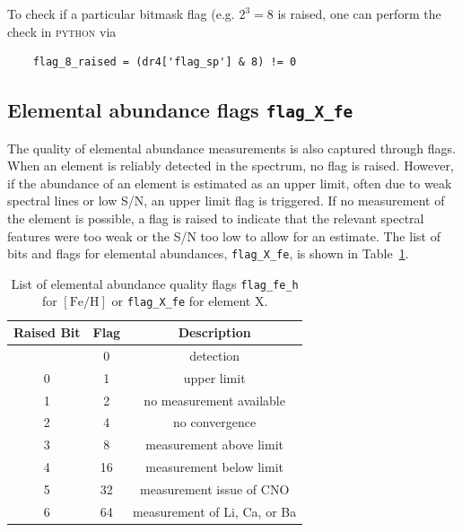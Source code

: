 \documentclass[
  journal=pasa,
  manuscript=research-paper, %
  year=2024,
  volume=37
]{cup-journal}
\newcommand{\feh}{$\mathrm{[Fe/H]}$\xspace}
\begin{document}
To check if a particular bitmask flag (e.g. $2^3 = 8$ is raised, one can perform the check in \textsc{python} via
\begin{verbatim}
    flag_8_raised = (dr4['flag_sp'] & 8) != 0
\end{verbatim}

\subsection{Elemental abundance flags \texttt{flag\_X\_fe}}
\label{sec:flag_x_fe}

The quality of elemental abundance measurements is also captured through flags. When an element is reliably detected in the spectrum, no flag is raised. However, if the abundance of an element is estimated as an upper limit, often due to weak spectral lines or low S/N, an upper limit flag is triggered. If no measurement of the element is possible, a flag is raised to indicate that the relevant spectral features were too weak or the S/N too low to allow for an estimate. The list of bits and flags for elemental abundances, \texttt{flag\_X\_fe}, is shown in Table~\ref{tab:flag_x_fe}.

\begin{table}
\centering
\caption{List of elemental abundance quality flags \texttt{flag\_fe\_h} for \feh or \texttt{flag\_X\_fe} for element X.}
\label{tab:flag_x_fe}
\begin{tabular}{ccc}
\hline \hline
Raised Bit & Flag & Description \\
\hline
  & 0 & detection \\ 
0 & 1 & upper limit \\ 
1 & 2 & no measurement available\\
2 & 4 & no convergence\\
3 & 8 & measurement above limit\\
4 & 16 & measurement below limit\\
5 & 32 & measurement issue of CNO \\
6 & 64 & measurement of Li, Ca, or Ba \\ %
\hline
\end{tabular}
\end{table}
\end{document}
